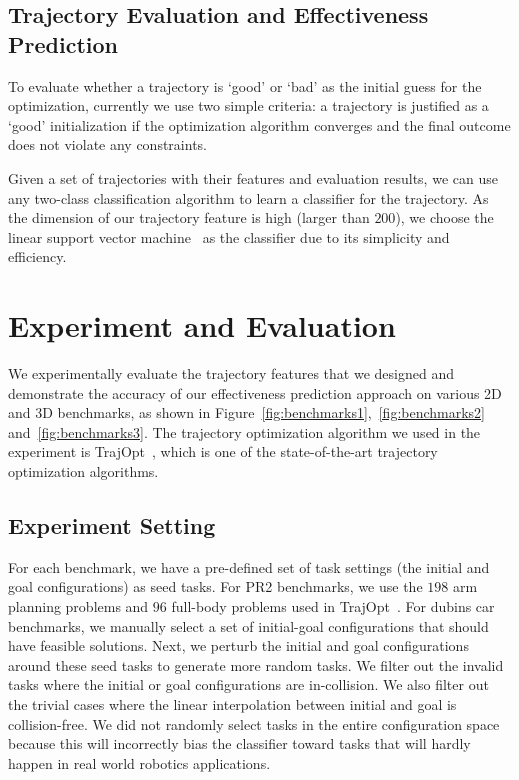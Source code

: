 \documentclass[letterpaper, 10 pt, conference]{ieeeconf}  %
\begin{document}
\subsection{Trajectory Evaluation and Effectiveness Prediction}
To evaluate whether a trajectory is `good' or `bad' as the initial guess for the optimization, currently we use two simple criteria: a trajectory is justified as a `good' initialization if the optimization algorithm converges and the final outcome does not violate any constraints. 

Given a set of trajectories with their features and evaluation results, we can use any two-class classification algorithm to learn a classifier for the trajectory. As the dimension of our trajectory feature is high (larger than $200$), we choose the linear support vector machine~\cite{Fan:2008:LLL} as the classifier due to its simplicity and efficiency.

\section{Experiment and Evaluation}
\label{sec:experiment}
We experimentally evaluate the trajectory features that we designed and demonstrate the accuracy of our effectiveness prediction approach on various 2D and 3D benchmarks, as shown in Figure~\ref{fig:benchmarks1},~\ref{fig:benchmarks2} and~\ref{fig:benchmarks3}. The trajectory optimization algorithm we used in the experiment is TrajOpt~\cite{Schulman:2013:FLO}, which is one of the state-of-the-art trajectory optimization algorithms.

\subsection{Experiment Setting}
For each benchmark, we have a pre-defined set of task settings (the initial and goal configurations) as seed tasks. For PR2 benchmarks, we use the $198$ arm planning problems and $96$ full-body problems used in TrajOpt~\cite{Schulman:2013:FLO}. For dubins car benchmarks, we manually select a set of initial-goal configurations that should have feasible solutions. Next, we perturb the initial and goal configurations around these seed tasks to generate more random tasks. We filter out the invalid tasks where the initial or goal configurations are in-collision. We also filter out the trivial cases where the linear interpolation between initial and goal is collision-free. We did not randomly select tasks in the entire configuration space because this will incorrectly bias the classifier toward tasks that will hardly happen in real world robotics applications.
\end{document}
